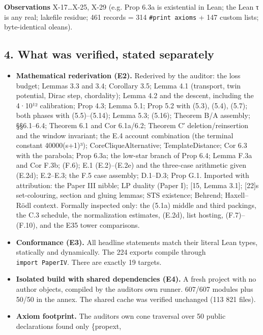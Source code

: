 \documentclass[
]{article}
\providecommand{\tightlist}{%
  \setlength{\itemsep}{0pt}\setlength{\parskip}{0pt}}
\begin{document}
\textbf{Observations} X-17\ldots X-25, X-29 (e.g. Prop 6.3a is
existential in Lean; the Lean τ is any real; lakefile residue; 461
records = 314 \texttt{\#print\ axioms} + 147 custom lists;
byte-identical oleans).

\subsection{4. What was verified, stated
separately}\label{4-what-was-verified-stated-separately}

\begin{itemize}
\tightlist
\item
  \textbf{Mathematical rederivation (E2).} Rederived by the auditor: the
  loss budget; Lemmas 3.3 and 3.4; Corollary 3.5; Lemma 4.1 (transport,
  twin potential, Dirac step, chordality); Lemma 4.2 and the descent,
  including the 4·10¹² calibration; Prop 4.3; Lemma 5.1; Prop 5.2 with
  (5.3), (5.4), (5.7); both phases with (5.5)--(5.14); Lemma 5.3;
  (5.16); Theorem B/A assembly; §§6.1--6.4; Theorem 6.1 and Cor
  6.1a/6.2; Theorem C′ deletion/reinsertion and the window invariant;
  the E.4 account combination (the terminal constant 40000(s+1)³);
  CoreCliqueAlternative; TemplateDistance; Cor 6.3 with the parabola;
  Prop 6.3a; the low-star branch of Prop 6.4; Lemma F.3a and Cor F.3b;
  (F.6); E.1 (E.2)--(E.2e) and the three-case arithmetic given (E.2d);
  E.2--E.3; the F.5 case assembly; D.1--D.3; Prop G.1. Imported with
  attribution: the Paper III nibble; LP duality (Paper I); {[}15, Lemma
  3.1{]}; {[}22{]}\textquotesingle s set-colouring, section and gluing
  lemmas; STS existence; Behrend; Haxell--Rödl context. Formally
  inspected only: the (5.1a) middle and third packings, the C.3
  schedule, the normalization estimates, (E.2d), list hosting,
  (F.7)--(F.10), and the E35 tower comparisons.
\item
  \textbf{Conformance (E3).} All headline statements match their literal
  Lean types, statically and dynamically. The 224 exports compile
  through \texttt{import\ PaperIV}. There are exactly 19 targets.
\item
  \textbf{Isolated build with shared dependencies (E4).} A fresh project
  with no author objects, compiled by the auditor\textquotesingle s own
  runner. 607/607 modules plus 50/50 in the annex. The shared cache was
  verified unchanged (113 821 files).
\item
  \textbf{Axiom footprint.} The auditor\textquotesingle s own cone
  traversal over 50 public declarations found only \{propext,

\end{itemize}
\end{document}
